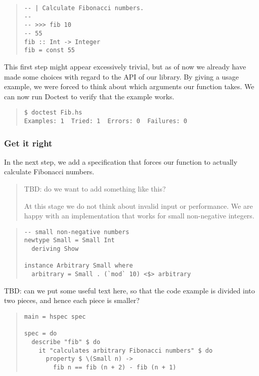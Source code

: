 \documentclass[preprint]{sigplanconf}
\begin{document}
\begin{quote}
\small
\begin{verbatim}
-- | Calculate Fibonacci numbers.
--
-- >>> fib 10
-- 55
fib :: Int -> Integer
fib = const 55
\end{verbatim}
\end{quote}

\noindent This first step might appear excessively trivial, but as of now we
already have made some choices with regard to the API of our library.
By giving a usage example, we were forced to think about which
arguments our function takes.  We can now run Doctest to verify that
the example works.

\begin{quote}
\small
\begin{verbatim}
$ doctest Fib.hs
Examples: 1  Tried: 1  Errors: 0  Failures: 0
\end{verbatim}
\end{quote}


\subsubsection{Get it right}

In the next step, we add a specification that forces our function to
actually calculate Fibonacci numbers.


\begin{quote}
    TBD: do we want to add something like this?

    At this stage we do not think about invalid input or performance.
    We are happy with an implementation that works for small
    non-negative integers.
\end{quote}

\begin{quote}
\small
\begin{verbatim}
-- small non-negative numbers
newtype Small = Small Int
  deriving Show

instance Arbitrary Small where
  arbitrary = Small . (`mod` 10) <$> arbitrary
\end{verbatim}
\end{quote}

\noindent TBD: can we put some useful text here, so that the code
example is divided into two pieces, and hence each piece is smaller?

\begin{quote}
\small
\begin{verbatim}
main = hspec spec

spec = do
  describe "fib" $ do
    it "calculates arbitrary Fibonacci numbers" $ do
      property $ \(Small n) ->
        fib n == fib (n + 2) - fib (n + 1)
\end{verbatim}
\end{quote}
\end{document}
